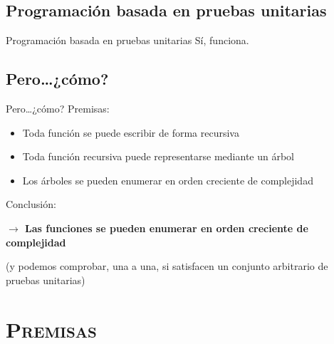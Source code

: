 \documentclass[xcolor=x11names,compress]{beamer}
\renewcommand{\(}{\begin{columns}}
\renewcommand{\)}{\end{columns}}
\newcommand{\<}[1]{\begin{column}{#1}}
\renewcommand{\>}{\end{column}}
\begin{document}
\subsection{Programación basada en pruebas unitarias}
\begin{frame}{Programación basada en pruebas unitarias}
    \codeFactorialTarget \pause
    Sí, funciona.
\end{frame}


\subsection{Pero\ldots ¿cómo?}
\begin{frame}{Pero\ldots ¿cómo?}
    Premisas:
    \pause
    \begin{itemize}
        \item Toda función se puede escribir de forma recursiva \pause
        \item Toda función recursiva puede representarse mediante un árbol \pause
        \item Los árboles se pueden enumerar en orden creciente de complejidad \pause
    \end{itemize}
    Conclusión:

    \textbf{$\rightarrow$ Las funciones se pueden enumerar en orden creciente de complejidad} \pause

    (y podemos comprobar, una a una, si satisfacen un conjunto arbitrario de pruebas unitarias)
\end{frame}


\section{\scshape Premisas}
\end{document}

